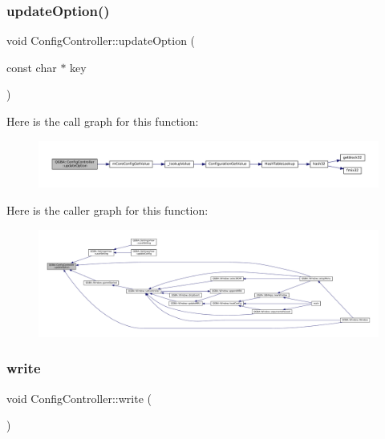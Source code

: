 \subsubsection{\texorpdfstring{update\+Option()}{updateOption()}}
{\footnotesize\ttfamily void Config\+Controller\+::update\+Option (\begin{DoxyParamCaption}\item[{const char $\ast$}]{key }\end{DoxyParamCaption})}

Here is the call graph for this function\+:
\nopagebreak
\begin{figure}[H]
\begin{center}
\leavevmode
\includegraphics[width=350pt]{class_q_g_b_a_1_1_config_controller_a059a8c29f3461330f6118749f6115e71_cgraph}
\end{center}
\end{figure}
Here is the caller graph for this function\+:
\nopagebreak
\begin{figure}[H]
\begin{center}
\leavevmode
\includegraphics[width=350pt]{class_q_g_b_a_1_1_config_controller_a059a8c29f3461330f6118749f6115e71_icgraph}
\end{center}
\end{figure}
\mbox{\label{class_q_g_b_a_1_1_config_controller_a7a2b85f2324ec8ef483e6c527bce2061}} 
\subsubsection{\texorpdfstring{write}{write}}
{\footnotesize\ttfamily void Config\+Controller\+::write (\begin{DoxyParamCaption}{ }\end{DoxyParamCaption})\hspace{0.3cm}{\ttfamily [slot]}}

